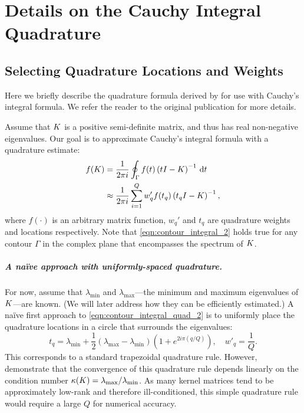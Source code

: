 \chapter{Details on the Cauchy Integral Quadrature}
\label{app:quadrature}

\section{Selecting Quadrature Locations and Weights}
Here we briefly describe the quadrature formula derived by \citet{hale2008computing} for use with Cauchy's integral formula.
We refer the reader to the original publication for more details.

Assume that $K$ is a positive semi-definite matrix, and thus has real non-negative eigenvalues.
Our goal is to approximate Cauchy's integral formula with a quadrature estimate:
%
\begin{align}
	f(K)
  &= \frac{1}{2 \pi i} \oint_\Gamma f(t) \left( t I - K \right)^{-1} \,\mathrm{d}{t}
  \label{eqn:contour_integral_2}
  \\
  &\approx
  \frac{1}{2 \pi i} \sum_{i=1}^Q w'_q f(t_q) \left( t_q I - K \right)^{-1},
  \label{eqn:contour_integral_quad_2}
\end{align}
%
where $f(\cdot)$ is an arbitrary matrix function, $w_q'$ and $t_q$ are quadrature weights and locations respectively.
Note that \cref{eqn:contour_integral_2} holds true for any contour $\Gamma$ in the complex plane that encompasses the spectrum of $K$.

\paragraph{A na\"ive approach with uniformly-spaced quadrature.}
For now, assume that $\lambda_\text{min}$ and $\lambda_\text{max}$---the minimum and maximum eigenvalues of $K$---are known.
(We will later address how they can be efficiently estimated.)
A na\"ive first approach to \cref{eqn:contour_integral_quad_2} is to uniformly place the quadrature locations in a circle that surrounds the eigenvalues:
%
\[
  t_q = \lambda_\text{min} + \frac 1 2 \left( \lambda_\text{max} - \lambda_\text{min} \right) \left( 1 + e^{2 i \pi \left( q / Q \right)} \right),
  \quad
  w'_q = \frac 1 Q.
\]
%
This corresponds to a standard trapezoidal quadrature rule.
However, \citet{hale2008computing} demonstrate that the convergence of this quadrature rule depends linearly on the condition number $\kappa(K) = \lambda_\text{max} / \lambda_\text{min}$.
As many kernel matrices tend to be approximately low-rank and therefore ill-conditioned, this simple quadrature rule would require a large $Q$ for numerical accuracy.

